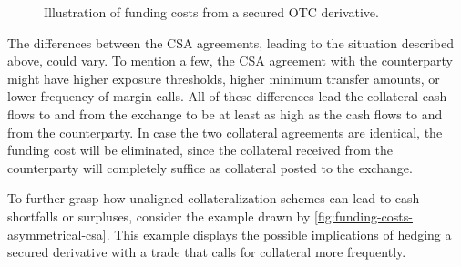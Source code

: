 \documentclass[main.tex]{subfiles}
\begin{document}
        \begin{figure}
            \centering
            \resizebox{\textwidth}{!}{%
            \begin{tikzpicture}
                
            \end{tikzpicture}        
            }   
            \caption{Illustration of funding costs from a secured OTC derivative.}
            \label{fig:funding-costs-secured-derivative}
        \end{figure}

        The differences between the CSA agreements, leading to the situation described above, could vary. 
        To mention a few, the CSA agreement with the counterparty might have higher exposure thresholds, 
        higher minimum transfer amounts, or lower frequency of margin calls.
        All of these differences lead the collateral cash flows to and from the exchange 
        to be at least as high as the cash flows to and from the counterparty. 
        In case the two collateral agreements are identical, the funding cost will be eliminated, 
        since the collateral received from the counterparty will completely suffice as collateral posted to the exchange.        

        To further grasp how unaligned collateralization schemes can lead to cash shortfalls or surpluses, 
        consider the example drawn by \cref{fig:funding-costs-asymmetrical-csa}.
        This example displays the possible implications of hedging a secured derivative
        with a trade that calls for collateral more frequently.
\end{document}
